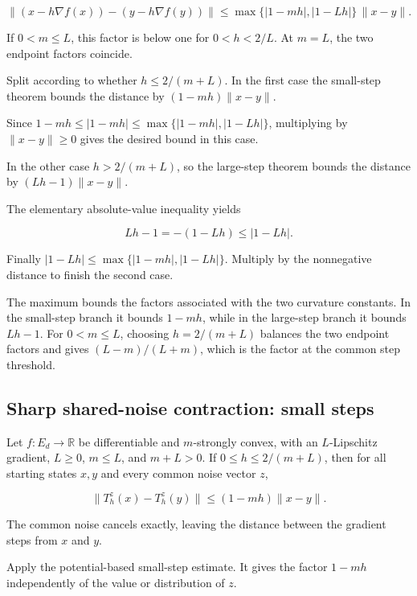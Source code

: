 \documentclass[11pt,a4paper]{article}
\begin{document}
\[\|(x-h\nabla f(x))-(y-h\nabla f(y))\|\le\max\{|1-mh|,|1-Lh|\}\,\|x-y\|.\]

If \(0<m\le L\), this factor is below one for \(0<h<2/L\). At \(m=L\), the two endpoint factors coincide.



Split according to whether \(h\le2/(m+L)\). In the first case the small-step theorem bounds the distance by \((1-mh)\|x-y\|\).



Since \(1-mh\le|1-mh|\le\max\{|1-mh|,|1-Lh|\}\), multiplying by \(\|x-y\|\ge0\) gives the desired bound in this case.



In the other case \(h>2/(m+L)\), so the large-step theorem bounds the distance by \((Lh-1)\|x-y\|\).



The elementary absolute-value inequality yields

\[Lh-1=-(1-Lh)\le|1-Lh|.\]

Finally \(|1-Lh|\le\max\{|1-mh|,|1-Lh|\}\). Multiply by the nonnegative distance to finish the second case.



The maximum bounds the factors associated with the two curvature constants. In the small-step branch it bounds \(1-mh\), while in the large-step branch it bounds \(Lh-1\). For \(0<m\le L\), choosing \(h=2/(m+L)\) balances the two endpoint factors and gives \((L-m)/(L+m)\), which is the factor at the common step threshold.


\subsection{\texorpdfstring{Sharp shared-noise contraction: small steps}{Sharp shared-noise contraction: small steps}}


Let \(f:E_d\to\mathbb R\) be differentiable and \(m\)-strongly convex, with an \(L\)-Lipschitz gradient, \(L\ge0\), \(m\le L\), and \(m+L>0\). If \(0\le h\le2/(m+L)\), then for all starting states \(x,y\) and every common noise vector \(z\),

\[\|T_h^z(x)-T_h^z(y)\|\le(1-mh)\|x-y\|.\]

The common noise cancels exactly, leaving the distance between the gradient steps from \(x\) and \(y\).



Apply the potential-based small-step estimate. It gives the factor \(1-mh\) independently of the value or distribution of \(z\).
\end{document}
